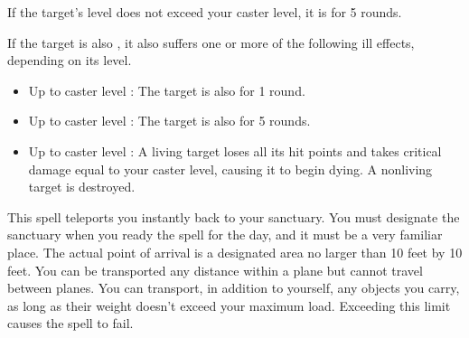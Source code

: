 \begin{spellheader}
    \begin{spelltargetinginfo}
    \end{spelltargetinginfo}
\end{spellheader}
\begin{spellcontent}
    \begin{spelleffects}
        \spelleffect If the target's level does not exceed your caster level, it is \bewildered for 5 rounds.

        If the target is also \bloodied, it also suffers one or more of the following ill effects, depending on its level.
        \begin{itemize}
            \item Up to caster level : The target is also \confused for 1 round.
            \item Up to caster level : The target is also \paralyzed for 5 rounds.
            \item Up to caster level : A living target loses all its hit points and takes critical damage equal to your caster level, causing it to begin dying. A nonliving target is destroyed.
        \end{itemize}
    \end{spelleffects}
\end{spellcontent}
\begin{spellfooter}

\end{spellfooter}

\begin{spellheader}
    \begin{spelltargetinginfo}
    \end{spelltargetinginfo}
\end{spellheader}
\begin{spellcontent}
    \begin{spelleffects}
        \spelleffect This spell teleports you instantly back to your sanctuary. You must designate the sanctuary when you ready the spell for the day, and it must be a very familiar place. The actual point of arrival is a designated area no larger than 10 feet by 10 feet. You can be transported any distance within a plane but cannot travel between planes. You can transport, in addition to yourself, any objects you carry, as long as their weight doesn't exceed your maximum load. Exceeding this limit causes the spell to fail.
    \end{spelleffects}
\end{spellcontent}
\begin{spellfooter}

\end{spellfooter}

